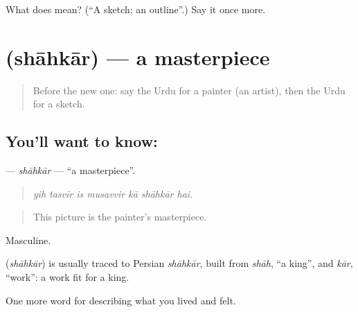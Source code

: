\begin{tcolorbox}[breakable,colback=teal!4,colframe=teal!35!black,title={Before you move on}]
What does  mean? (\textquotedblleft{}A sketch; an outline\textquotedblright{}.) Say it once more.
\end{tcolorbox}
\section[\texorpdfstring{\ur{شاہکار} (shāhkār)}{شاہکار (shāhkār)}]{ (shāhkār) — a masterpiece}

\label{lesson:UR-C515-shahkar}



\begin{quote}
Before the new one: say the Urdu for a painter (an artist), then the Urdu for a sketch.
\end{quote}

\subsection*{You'll want to know: }
\textbf{} — \emph{shāhkār} — \textquotedblleft{}a masterpiece\textquotedblright{}.

\begin{quote}
      
\end{quote}

\begin{quote}
\emph{yih tasvīr is musavvir kā shāhkār hai.}
\end{quote}

\begin{quote}
This picture is the painter's masterpiece.
\end{quote}

Masculine.

\begin{cousinweb}
\textbf{} (\emph{shāhkār}) is usually traced to Persian \emph{shāhkār}, built from \emph{shāh}, \textquotedblleft{}a king\textquotedblright{}, and \emph{kār}, \textquotedblleft{}work\textquotedblright{}: a work fit for a king.
\end{cousinweb}

\begin{grammarlens}[title={What you've built}]
One more word for describing what you lived and felt.
\end{grammarlens}

